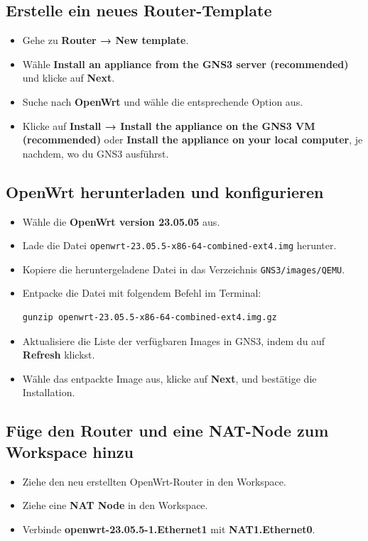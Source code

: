 \documentclass[12pt, a4paper]{article}\usepackage{listings}
\begin{document}
\subsection{Erstelle ein neues Router-Template}
\begin{itemize}
    \item Gehe zu \textbf{Router → New template}.
    \item Wähle \textbf{Install an appliance from the GNS3 server (recommended)} und klicke auf \textbf{Next}.
    \item Suche nach \textbf{OpenWrt} und wähle die entsprechende Option aus.
    \item Klicke auf \textbf{Install → Install the appliance on the GNS3 VM (recommended)} oder \textbf{Install the appliance on your local computer}, je nachdem, wo du GNS3 ausführst.
\end{itemize}

\subsection{OpenWrt herunterladen und konfigurieren}
\begin{itemize}
    \item Wähle die \textbf{OpenWrt version 23.05.05} aus.
    \item Lade die Datei \texttt{openwrt-23.05.5-x86-64-combined-ext4.img} herunter.
    \item Kopiere die heruntergeladene Datei in das Verzeichnis \texttt{GNS3/images/QEMU}.
    \item Entpacke die Datei mit folgendem Befehl im Terminal:
    \begin{verbatim}
gunzip openwrt-23.05.5-x86-64-combined-ext4.img.gz
    \end{verbatim}
    \item Aktualisiere die Liste der verfügbaren Images in GNS3, indem du auf \textbf{Refresh} klickst.
    \item Wähle das entpackte Image aus, klicke auf \textbf{Next}, und bestätige die Installation.
\end{itemize}

\subsection{Füge den Router und eine NAT-Node zum Workspace hinzu}
\begin{itemize}
    \item Ziehe den neu erstellten OpenWrt-Router in den Workspace.
    \item Ziehe eine \textbf{NAT Node} in den Workspace.
    \item Verbinde \textbf{openwrt-23.05.5-1.Ethernet1} mit \textbf{NAT1.Ethernet0}.
\end{itemize}
\end{document}
